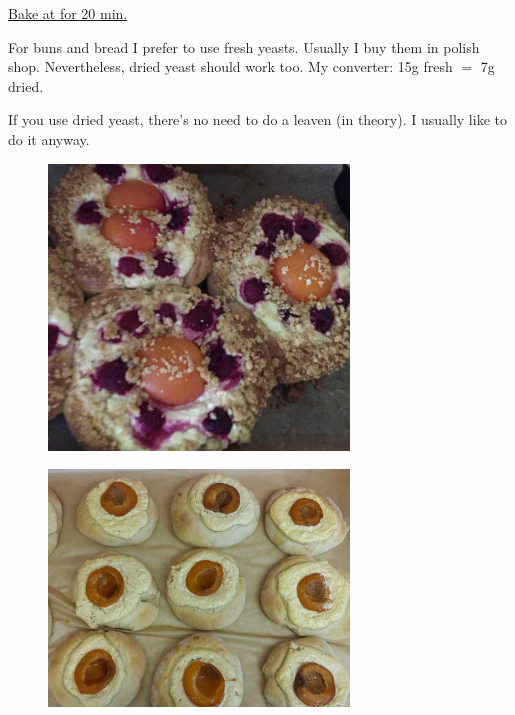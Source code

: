\begin{recipe}
{        \step \underline{Bake at \unit[180]{\textcelcius} for 20 min.}
        \vspace{2cm}
    }

    \suggestion
    {%
        For buns and bread I prefer to use fresh yeasts.
        Usually I buy them in polish shop.
        Nevertheless, dried yeast should work too.
        My converter: 15g fresh $=$ 7g dried.

        If you use dried yeast, there's no need to do a leaven (in theory).
        I usually like to do it anyway.
    }


\end{recipe}

\begin{figure}[h]
    \centering
    \includegraphics[width=8cm]{pic/buns_apricot_quark}
\end{figure}

\begin{figure}[h]
    \centering
    \includegraphics[width=8cm]{pic/buns_apricot}
\end{figure}
